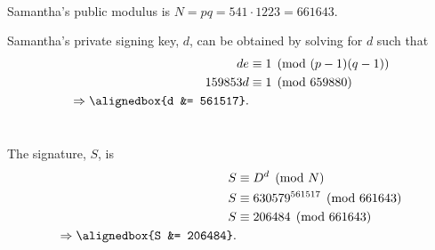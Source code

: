 \documentclass[
  coursecode={MTHE 418},
  assignmentname={Homework \homeworknumber},
  studentnumber=20053722,
  name={Bryan Hoang},
  draft,
]{
  ltxanswer%
}
\begin{document}
  \begin{questions}
    \setcounter{question}{\questionnumber}
    \addtocounter{question}{-1}
    \question[10]\
    \begin{parts}
      \part{}
      \begin{solution}
        Samantha's public modulus is \(N = pq = 541 \cdot 1223 = \boxed{661643}\).

        Samantha's private signing key, \(d\), can be obtained by solving for \(d\) such that
        \begin{align*}
          de                        &\equiv 1 \pmod{(p-1)(q-1)} \\
          159853d                   &\equiv 1 \pmod{659880}     \\
          \Rightarrow \alignedbox{d &= 561517}.
        \end{align*}
      \end{solution}

      \part{}
      \begin{solution}
        The signature, \(S\), is
        \begin{align*}
          S                         &\equiv D^{d} \pmod{N}                \\
          S                         &\equiv 630579^{561517} \pmod{661643} \\
          S                         &\equiv 206484 \pmod{661643}          \\
          \Rightarrow \alignedbox{S &= 206484}.
        \end{align*}
      \end{solution}
    \end{parts}
  \end{questions}
\end{document}
